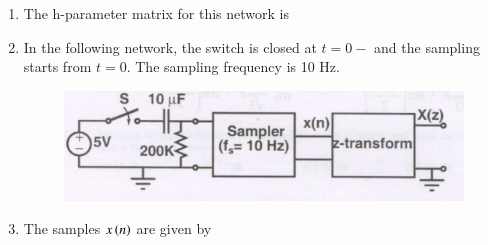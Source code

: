 \documentclass[a4paper, 11pt]{article}
\begin{document}
\begin{enumerate}
    \hfill{}
    
    \item The h-parameter matrix for this network is
    \begin{enumerate}
    \end{enumerate}
    
    \hfill{}
    
    \item[] In the following network, the switch is closed at $t=0-$ and the sampling starts from $t=0$. The sampling frequency is 10 Hz.
    \begin{figure}[H]
        \centering
        \includegraphics[width=\columnwidth]{q78}
        \caption*{}
        \label{fig:q78}
    \end{figure}
    
    \item The samples $x\left(n\right)$  are given by
    \begin{enumerate}
    \end{enumerate}
    

\end{enumerate}
\end{document}
